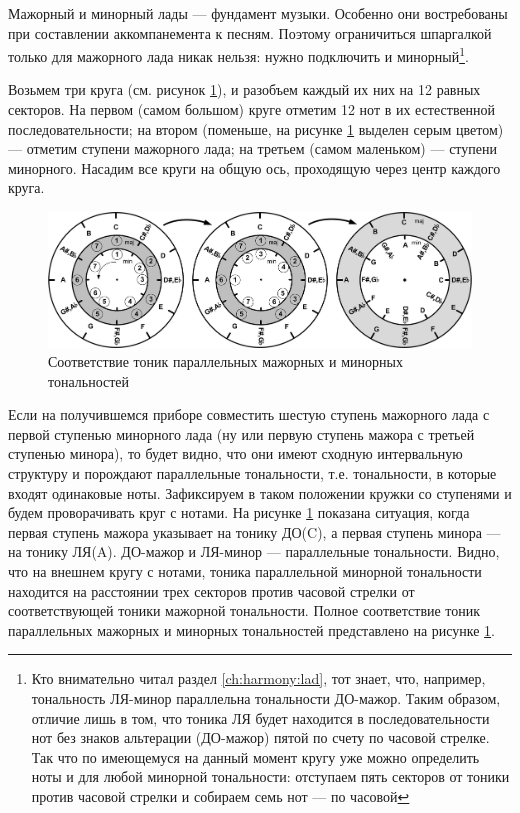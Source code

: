 Мажорный и минорный лады --- фундамент музыки. Особенно они востребованы при составлении аккомпанемента к песням. Поэтому ограничиться шпаргалкой только для мажорного лада никак нельзя: нужно подключить и минорный\footnote{Кто внимательно читал раздел \ref{ch:harmony:lad}, тот знает, что, например, тональность ЛЯ-минор параллельна тональности ДО-мажор. Таким образом, отличие лишь в том, что тоника ЛЯ будет находится в последовательности нот без знаков альтерации (ДО-мажор) пятой по счету по часовой стрелке. Так что по имеющемуся на данный момент кругу уже можно определить ноты и для любой минорной тональности: отступаем пять секторов от тоники против часовой стрелки и собираем семь нот --- по часовой}.

Возьмем три круга (см. рисунок \ref{fig:harmony:kvinto-kvarto:minor-major-mapping}), и разобъем каждый их них на 12 равных секторов. На первом (самом большом) круге отметим 12 нот в их естественной последовательности; на втором (поменьше, на рисунке \ref{fig:harmony:kvinto-kvarto:minor-major-mapping} выделен серым цветом) --- отметим ступени мажорного лада; на третьем (самом маленьком) --- ступени минорного. Насадим все круги на общую ось, проходящую через центр каждого круга.

\begin{figure}[!ht]
    \centering
    \includegraphics[scale=0.5]{fig/kvinto-kvarto/minor-major-mapping} 
    \caption{Соответствие тоник параллельных мажорных и минорных тональностей}\label{fig:harmony:kvinto-kvarto:minor-major-mapping}
\end{figure}

Если на получившемся приборе совместить шестую ступень мажорного лада с первой ступенью минорного лада (ну или первую ступень мажора с третьей ступенью минора), то будет видно, что они имеют сходную интервальную структуру и порождают параллельные тональности, т.е. тональности, в которые входят одинаковые ноты. Зафиксируем в таком положении кружки со ступенями и будем проворачивать круг с нотами. На рисунке \ref{fig:harmony:kvinto-kvarto:minor-major-mapping} показана ситуация, когда первая ступень мажора указывает на тонику ДО(C), а первая ступень минора --- на тонику ЛЯ(A). ДО-мажор и ЛЯ-минор --- параллельные тональности. Видно, что на внешнем кругу с нотами, тоника параллельной минорной тональности находится на расстоянии трех секторов против часовой стрелки от соответствующей тоники мажорной тональности. Полное соответствие тоник параллельных мажорных и минорных тональностей представлено на рисунке \ref{fig:harmony:kvinto-kvarto:minor-major-mapping}.

